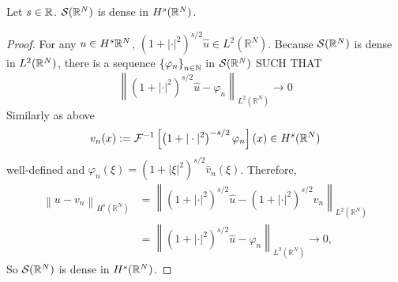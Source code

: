 \begin{prop}
	Let $s \in \mathbb{R}$. $\mathcal{S}(\mathbb{R}^N)$ is dense in $H^s(\mathbb{R}^N)$.
\end{prop}
\begin{proof}
	For any $u \in H^s{\mathbb{R}^N}$, $\left(1+|\cdot|^2\right)^{s / 2} \widehat{u} \in L^2\left(\mathbb{R}^N\right)$. Because $\mathcal{S}(\mathbb{R}^N)$ is dense in $L^2(\mathbb{R}^N)$, there is a sequence $\left\{\varphi_n\right\}_{n \in \mathbb{N}}$ in $\mathcal{S}(\mathbb{R}^N)$ SUCH THAT
	\begin{equation*}
		\left\|\left(1+|\cdot|^2\right)^{s / 2} \widehat{u}-\varphi_n\right\|_{L^2\left(\mathbb{R}^N\right)} \rightarrow 0
	\end{equation*}
	Similarly as above
	\begin{equation*}
		v_n(x):=\mathcal{F}^{-1}\left[\left(1+|\cdot|^2\right)^{-s / 2} \varphi_n\right](x) \in H^s(\mathbb{R}^N)
	\end{equation*}
	well-defined and $\varphi_n(\xi)=\left(1+|\xi|^2\right)^{s / 2} \widehat{v}_n(\xi)$. Therefore,
	\begin{equation*}
		\begin{aligned}
			\left\|u-v_n\right\|_{H^s\left(\mathbb{R}^N\right)} & =\left\|\left(1+|\cdot|^2\right)^{s / 2} \widehat{u}-\left(1+|\cdot|^2\right)^{s / 2} \widehat{v}_n\right\|_{L^2\left(\mathbb{R}^N\right)} \\
			& =\left\|\left(1+|\cdot|^2\right)^{s / 2} \widehat{u}-\varphi_n\right\|_{L^2\left(\mathbb{R}^N\right)} \rightarrow 0,
		\end{aligned}
	\end{equation*}
	So $\mathcal{S}(\mathbb{R}^N)$ is dense in $H^s(\mathbb{R}^N)$.
\end{proof}

